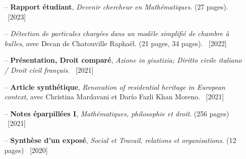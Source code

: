 \documentclass[10pt]{article}
\newcommand\tab[1][1cm]{\hspace*{#1}}
\begin{document}
		\begin{itemize}[itemsep = -0.75 mm]
			\item[--] \noindent \textbf{Rapport étudiant}, \textit{Devenir chercheur en Mathématiques}. (27 pages). \hfill {\ \small [2023]}
			\item[--] \noindent \textit{Détection de particules chargées dans un modèle simplifié de chambre à bulles}, avec Decan de Chatouville Raphaël. (21 pages, 34 pages). \hfill {\ \small [2022]}
			\item[--] \noindent \textbf{Présentation, Droit comparé}, \textit{Azione in giustizia; Diritto civile italiano / Droit civil français}. \hfill {\ \small [2021]}
			\item[--] \noindent \textbf{Article synthétique}, \textit{Renovation of residential heritage in European context}, avec Christina Mardavani et Darío Fazli Khan Moreno. \hfill {\ \small [2021]}
			\item[--] \noindent \textbf{Notes éparpillées I}, \textit{Mathématiques, philosophie et droit}. (256 pages) \hfill {\ \small [2021]}
			\item[--] \noindent \textbf{Synthèse d'un exposé}, \textit{Social et Travail, relations et organisations}. (12 pages) \hfill {\ \small [2020]}

\end{itemize}
\end{document}
